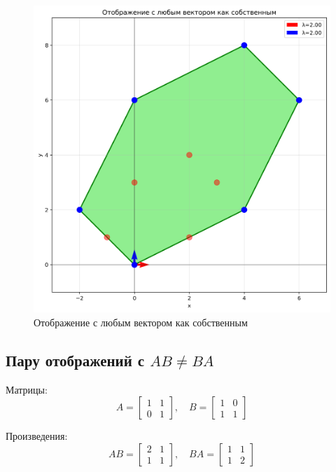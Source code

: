 \begin{figure}[h]
\centering
\begin{minipage}{0.31\textwidth}
\centering
\includegraphics[width=\textwidth]{images/task1/any_vector_eigenvector.png}
\caption{Отображение с любым вектором как собственным}
\label{fig:any_vector_eigenvector}
\end{minipage}
\end{figure}

\subsection*{Пару отображений с $AB \neq BA$}

Матрицы:
\begin{equation}
A = \begin{bmatrix} 1 & 1 \\ 0 & 1 \end{bmatrix}, \quad
B = \begin{bmatrix} 1 & 0 \\ 1 & 1 \end{bmatrix}
\end{equation}

Произведения:
\begin{equation}
AB = \begin{bmatrix} 2 & 1 \\ 1 & 1 \end{bmatrix}, \quad
BA = \begin{bmatrix} 1 & 1 \\ 1 & 2 \end{bmatrix}
\end{equation}

